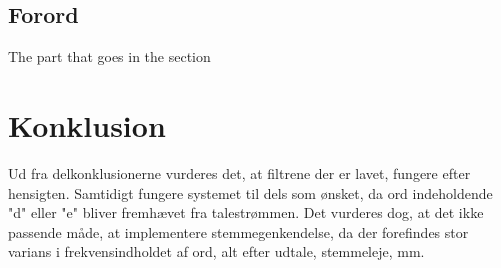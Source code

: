 



\pagestyle{fancy}
\fancyhf{}
\lhead{\GroupNumber}
\tableofcontents
\thispagestyle{fancy}
\newpage



\section*{Forord}
%
The part that goes in the section






\chapter*{Konklusion}
\setcounter{chapter}{9}
\setcounter{section}{0}
%
\thispagestyle{fancy}
Ud fra delkonklusionerne vurderes det, at filtrene der er lavet, fungere efter hensigten. Samtidigt fungere systemet til dels som ønsket, da ord indeholdende "d" eller "e" bliver fremhævet fra talestrømmen. Det vurderes dog, at det ikke passende måde, at implementere stemmegenkendelse, da der forefindes stor varians i frekvensindholdet af ord, alt efter udtale, stemmeleje, mm. 



